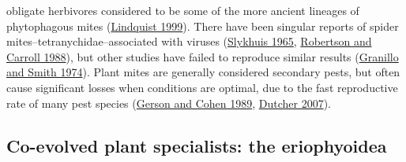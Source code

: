 \documentclass[12pt,final,CPage]{ufthesis}
\begin{document}
{obligate herbivores considered to be some of the more ancient lineages of phytophagous mites (\protect\hyperlink{ref-Lindquist1999}{Lindquist 1999}). There have been singular reports of spider mites--tetranychidae--associated with viruses (\protect\hyperlink{ref-Slykhuis1965}{Slykhuis 1965}, \protect\hyperlink{ref-Robertson1988}{Robertson and Carroll 1988}), but other studies have failed to reproduce similar results (\protect\hyperlink{ref-Granillo1974}{Granillo and Smith 1974}). Plant mites are generally considered secondary pests, but often cause significant losses when conditions are optimal, due to the fast reproductive rate of many pest species (\protect\hyperlink{ref-Gerson1989}{Gerson and Cohen 1989}, \protect\hyperlink{ref-Dutcher2007}{Dutcher 2007}).

  \hypertarget{litrev-erios}{%
  \subsection{Co-evolved plant specialists: the eriophyoidea}\label{litrev-erios}}

}
\end{document}
